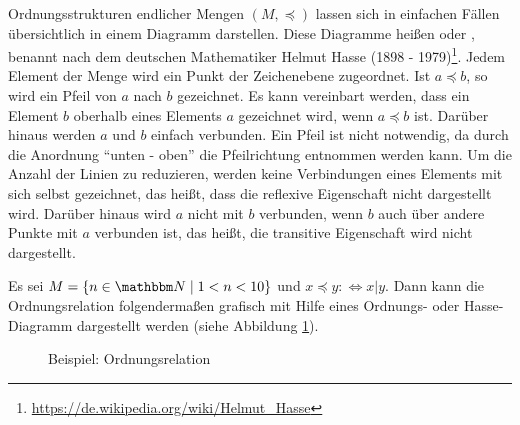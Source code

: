 \begin{Unit}
Ordnungsstrukturen endlicher Mengen $(M, \preceq)$ lassen sich in einfachen 
Fällen übersichtlich in einem Diagramm darstellen. Diese Diagramme heißen
 oder , benannt nach 
dem deutschen Mathematiker Helmut Hasse (1898 - 1979)\footnote{\url{https://de.wikipedia.org/wiki/Helmut_Hasse}}. 
Jedem Element der Menge wird ein Punkt der Zeichenebene zugeordnet. Ist $a 
\preceq b$, so wird ein Pfeil von $a$ nach $b$ gezeichnet. Es kann vereinbart 
werden, dass ein Element $b$ oberhalb eines Elements $a$ gezeichnet wird, 
wenn $a \preceq b$ ist. Darüber hinaus werden $a$ und $b$ einfach verbunden. 
Ein Pfeil ist nicht notwendig, da durch die Anordnung \enquote{unten - oben} 
die Pfeilrichtung entnommen werden kann. Um die Anzahl der Linien zu 
reduzieren, werden keine Verbindungen eines Elements mit sich selbst 
gezeichnet, das heißt, dass die reflexive Eigenschaft nicht dargestellt wird.
Darüber hinaus wird $a$ nicht mit $b$ verbunden, wenn $b$ auch über andere 
Punkte mit $a$ verbunden ist, das heißt, die transitive Eigenschaft wird 
nicht dargestellt.
\end{Unit}

\begin{Unit}[Beispiel]
  Es sei $M = \{ n \in \NN \mid 1 < n < 10 \}$ und $x \preceq y 
  :\Leftrightarrow x|y$. Dann kann die Ordnungsrelation folgendermaßen 
  grafisch mit Hilfe eines Ordnungs- oder Hasse-Diagramm dargestellt werden 
  (siehe Abbildung \ref{abb:rel:Beispiel: Ordnungsrelation}).

\begin{figure}[htbp]
\begin{center}
  \setlength{\unitlength}{1.0cm}
  \caption{Beispiel: Ordnungsrelation}
  \label{abb:rel:Beispiel: Ordnungsrelation}
\end{center}
\end{figure}
\end{Unit}


